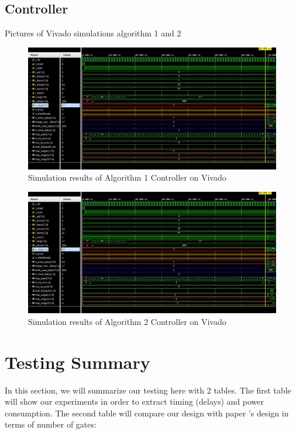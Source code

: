 \documentclass[letterpaper, 11pt]{article}
\begin{document}
	\subsection{Controller}
	\label{subsec:controller}
	Pictures of Vivado simulations algorithm 1 and 2
	\begin{figure}[htb!]
		\centering
		\includegraphics[width=0.85\linewidth]{report_pics/controller_algo1_vivado.jpg}
		\caption{Simulation results of Algorithm 1 Controller on Vivado}
		\label{fig43}
	\end{figure}
	
	\begin{figure}[htb!]
		\centering
		\includegraphics[width=0.85\linewidth]{report_pics/controller_algo2_vivado.jpg}
		\caption{Simulation results of Algorithm 2 Controller on Vivado}
		\label{fig44}
	\end{figure}
	
	\newpage
	\section{Testing Summary}
	\label{sec:testsumm}
	
	In this section, we will summarize our testing here with 2 tables. The first table will show our experiments in order to extract timing (delays) and power consumption. The second table will compare our design with paper \cite{1}'s design in terms of number of gates:
	
\end{document}
